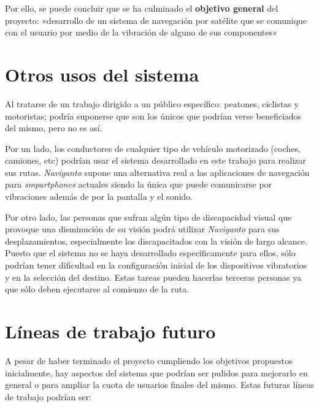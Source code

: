 Por ello, se puede concluir que se ha culminado el \textbf{objetivo general} del proyecto:
«desarrollo de un sistema de navegación por satélite que se comunique con el usuario por medio de la
  vibración de alguno de sus componentes»

\section{Otros usos del sistema}

Al tratarse de un trabajo dirigido a un público específico: peatones, ciclistas y motoristas; podría
suponerse que son los únicos que podrían verse beneficiados del mismo, pero no es así.

Por un lado, los conductores de cualquier tipo de vehículo motorizado (coches, camiones, etc)
podrían usar el sistema desarrollado en este trabajo para realizar sus rutas. \emph{Naviganto}
supone una alternativa real a las aplicaciones de navegación para \emph{smpartphones} actuales
siendo la única que puede comunicarse por vibraciones además de por la pantalla y el sonido.

Por otro lado, las personas que sufran algún tipo de discapacidad visual que provoque una
disminución de su visión podrá utilizar \emph{Naviganto} para sus desplazamientos, especialmente los
discapacitados con la visión de largo alcance. Puesto que el sistema no se haya desarrollado
específicamente para ellos, sólo podrían tener dificultad en la configuración inicial de los
dispositivos vibratorios y en la selección del destino. Estas tareas pueden hacerlas terceras
personas ya que sólo deben ejecutarse al comienzo de la ruta.

\section{Líneas de trabajo futuro}

A pesar de haber terminado el proyecto cumpliendo los objetivos propuestos inicialmente, hay
aspectos del sistema que podrían ser pulidos para mejorarlo en general o para ampliar la cuota de
usuarios finales del mismo. Estas futuras líneas de trabajo podrían ser:

